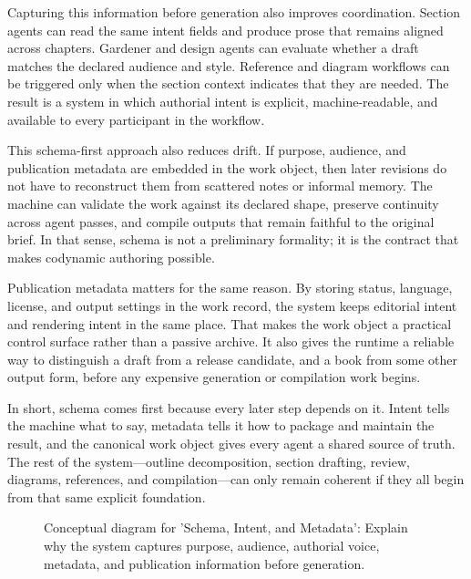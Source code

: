 Capturing this information before generation also improves coordination. Section agents can read the same intent fields and produce prose that remains aligned across chapters. Gardener and design agents can evaluate whether a draft matches the declared audience and style. Reference and diagram workflows can be triggered only when the section context indicates that they are needed. The result is a system in which authorial intent is explicit, machine-readable, and available to every participant in the workflow.

This schema-first approach also reduces drift. If purpose, audience, and publication metadata are embedded in the work object, then later revisions do not have to reconstruct them from scattered notes or informal memory. The machine can validate the work against its declared shape, preserve continuity across agent passes, and compile outputs that remain faithful to the original brief. In that sense, schema is not a preliminary formality; it is the contract that makes codynamic authoring possible.

Publication metadata matters for the same reason. By storing status, language, license, and output settings in the work record, the system keeps editorial intent and rendering intent in the same place. That makes the work object a practical control surface rather than a passive archive. It also gives the runtime a reliable way to distinguish a draft from a release candidate, and a book from some other output form, before any expensive generation or compilation work begins.

In short, schema comes first because every later step depends on it. Intent tells the machine what to say, metadata tells it how to package and maintain the result, and the canonical work object gives every agent a shared source of truth. The rest of the system---outline decomposition, section drafting, review, diagrams, references, and compilation---can only remain coherent if they all begin from that same explicit foundation.

\begin{figure}[htbp]
\centering

\caption{Conceptual diagram for 'Schema, Intent, and Metadata': Explain why the system captures purpose, audience, authorial voice, metadata, and publication information before generation.}
\end{figure}
